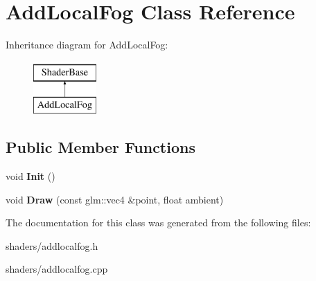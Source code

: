 \hypertarget{classAddLocalFog}{\section{\-Add\-Local\-Fog \-Class \-Reference}
\label{classAddLocalFog}
}
\-Inheritance diagram for \-Add\-Local\-Fog\-:\begin{figure}[H]
\begin{center}
\leavevmode
\includegraphics[height=2.000000cm]{classAddLocalFog}
\end{center}
\end{figure}
\subsection*{\-Public \-Member \-Functions}
\begin{DoxyCompactItemize}
\item 
\hypertarget{classAddLocalFog_a4bbf62a52b77842e3855e05b22e1206e}{void {\bfseries \-Init} ()}\label{classAddLocalFog_a4bbf62a52b77842e3855e05b22e1206e}

\item 
\hypertarget{classAddLocalFog_a0aacc047e5f7e74161b7a603dac0a823}{void {\bfseries \-Draw} (const glm\-::vec4 \&point, float ambient)}\label{classAddLocalFog_a0aacc047e5f7e74161b7a603dac0a823}

\end{DoxyCompactItemize}


\-The documentation for this class was generated from the following files\-:\begin{DoxyCompactItemize}
\item 
shaders/addlocalfog.\-h\item 
shaders/addlocalfog.\-cpp\end{DoxyCompactItemize}
